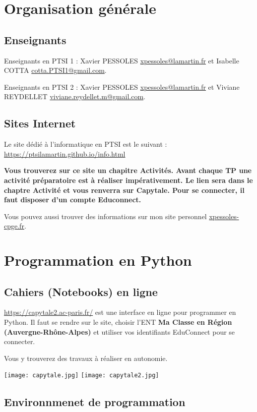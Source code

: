 \section{Organisation générale}
\subsection{Enseignants}
Enseignants en PTSI 1 : Xavier PESSOLES \url{xpessoles@lamartin.fr} et Isabelle COTTA \url{cotta.PTSI1@gmail.com}.

Enseignants en PTSI 2 : Xavier PESSOLES \url{xpessoles@lamartin.fr} et Viviane REYDELLET \url{viviane.reydellet.m@gmail.com}.

\subsection{Sites Internet}

Le site dédié à l'informatique en PTSI est le suivant :
\url{https://ptsilamartin.github.io/info.html}

\textbf{Vous trouverez sur ce site un chapitre {Activités}. Avant chaque TP une activité préparatoire est à réaliser impérativement. Le lien sera dans le chaptre Activité et vous renverra sur Capytale. Pour se connecter, il faut disposer d'un compte Educonnect.}


Vous pouvez aussi trouver des informations sur mon site personnel \url{xpessoles-cpge.fr}.
\section{Programmation en Python}
\subsection{Cahiers (Notebooks) en ligne}

\url{https://capytale2.ac-paris.fr/} est une interface en ligne pour programmer en Python.
Il faut se rendre sur le site, choisir l'ENT \textbf{Ma Classe en Région (Auvergne-Rhône-Alpes)} et utiliser vos identifiants EduConnect pour se connecter.

Vous y trouverez des travaux à réaliser en autonomie.

\begin{center}
\texttt{[image: capytale.jpg]}
\texttt{[image: capytale2.jpg]}
\end{center}

\subsection{Environnmenet de programmation}

